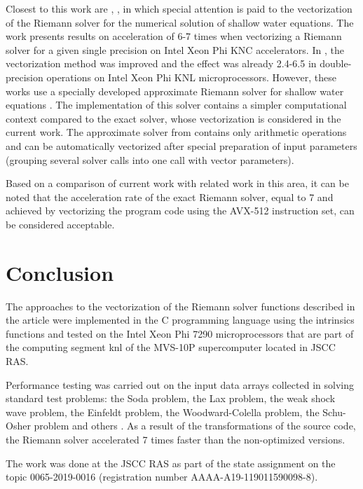 \documentclass[utf8,english]{psta}%
\begin{document}
Closest to this work are \cite{BaderSWEVect}, \cite{FerreiraSWEVect}, in which special attention is paid to the vectorization of the Riemann solver for the numerical solution of shallow water equations.
The work \cite{BaderSWEVect} presents results on acceleration of 6-7 times when vectorizing a Riemann solver for a given single precision on Intel Xeon Phi KNC accelerators.
In \cite{FerreiraSWEVect}, the vectorization method was improved and the effect was already 2.4-6.5 in double-precision operations on Intel Xeon Phi KNL microprocessors.
However, these works use a specially developed approximate Riemann solver for shallow water equations \cite{George}.
The implementation of this solver contains a simpler computational context compared to the exact solver, whose vectorization is considered in the current work.
The approximate solver from \cite{George} contains only arithmetic operations and can be automatically vectorized after special preparation of input parameters (grouping several solver calls into one call with vector parameters).

Based on a comparison of current work with related work in this area, it can be noted that the acceleration rate of the exact Riemann solver, equal to 7 and achieved by vectorizing the program code using the AVX-512 instruction set, can be considered acceptable.

\section*{Conclusion}

The approaches to the vectorization of the Riemann solver functions described in the article were implemented in the C programming language using the intrinsics functions and tested on the Intel Xeon Phi 7290 microprocessors that are part of the computing segment knl of the MVS-10P supercomputer located in JSCC RAS.

Performance testing was carried out on the input data arrays collected in solving standard test problems: the Soda problem, the Lax problem, the weak shock wave problem, the Einfeldt problem, the Woodward-Colella problem, the Schu-Osher problem and others \cite{BulVolTest}.
As a result of the transformations of the source code, the Riemann solver accelerated 7 times faster than the non-optimized versions.

The work was done at the JSCC RAS as part of the state assignment on the topic 0065-2019-0016 (registration number AAAA-A19-119011590098-8). 
\end{document}
